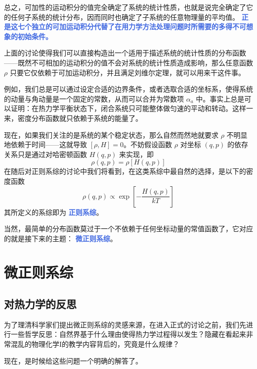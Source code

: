 总之，可加性的运动积分的值完全确定了系统的统计性质，也就是说完全确定了它的任何子系统的统计分布，因而同时也确定了子系统的任意物理量的平均值。 \textcolor{RoyalBlue}{\textbf{\kaishu 正是这七个独立的可加运动积分代替了在用力学方法处理问题时所需要的多得不可想象的初始条件。}}

上面的讨论使得我们可以直接构造出一个适用于描述系统的统计性质的分布函数——既然不可相加的运动积分的值不会对系统的统计性质造成影响，那么任意函数 $\rho$ 只要它仅依赖于可加运动积分，并且满足刘维尔定理，就可以用来干这件事。

例如，我们总是可以通过设定合适的边界条件，或者选取合适的坐标系，使得系统的动量与角动量是一个固定的常数，从而可以合并为常数项 $\alpha_a$ 中。事实上总是可以证明\cite{lan}：在热力学平衡状态下，闭合系统只可能整体做匀速的平动和转动。这样一来，密度分布函数就只依赖于系统的能量了。

现在，如果我们关注的是系统的某个稳定状态，那么自然而然地就要求 $\rho$ 不明显地依赖于时间——这就导致 $[\rho, H] = 0$。不妨假设函数 $\rho$ 对坐标 $(q,p)$ 的依存关系只是通过对哈密顿函数 $H(q,p)$ 来实现，即
\begin{equation}
    \rho(q,p) = \rho[H(q,p)]
\end{equation} 
在随后对正则系综的讨论中我们将看到，在这类系综中最自然的选择，是以下的密度函数
\begin{equation}
    \rho(q, p) \propto \exp \left[-\frac{H(q, p)}{k T}\right]
\end{equation}
其所定义的系综即为 \textcolor{RoyalBlue}{\textbf{\kaishu 正则系综}}。

当然，最简单的分布函数莫过于一个不依赖于任何坐标动量的常值函数了，它对应的就是接下来的主题： \textcolor{RoyalBlue}{\textbf{\kaishu 微正则系综}}。



\section{微正则系综}\label{sec:微正则系综}

\subsection{对热力学的反思}

为了理清科学家们提出微正则系综的灵感来源，在进入正式的讨论之前，我们先进行一些哲学反思：自然界基于什么理由使得热力学过程得以发生？隐藏在看起来非常混乱的物理化学I的教学内容背后的，究竟是什么规律？

现在，是时候给这些问题一个明确的解答了。

